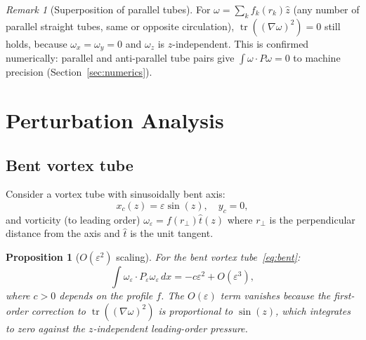 \documentclass[11pt,a4paper]{article}
\theoremstyle{plain}
\newtheorem{proposition}[theorem]{Proposition}
\theoremstyle{definition}
\theoremstyle{remark}
\newtheorem{remark}[theorem]{Remark}
\DeclareMathOperator{\tr}{tr}
\begin{document}
\begin{remark}[Superposition of parallel tubes]
\label{rem:parallel}
For $\omega = \sum_k f_k(r_k)\hat z$ (any number
of parallel straight tubes, same or opposite
circulation), $\tr((\nabla\omega)^2) = 0$ still
holds, because
$\omega_x=\omega_y=0$ and $\omega_z$ is
$z$-independent.
This is confirmed numerically: parallel and
anti-parallel tube pairs give
$\int\omega\cdot P\omega = 0$ to machine
precision (Section~\ref{sec:numerics}).
\end{remark}


\section{Perturbation Analysis}\label{sec:perturb}

\subsection{Bent vortex tube}

Consider a vortex tube with sinusoidally bent
axis:
\begin{equation}\label{eq:bent}
x_c(z) = \varepsilon\sin(z),\quad y_c=0,
\end{equation}
and vorticity (to leading order)
$\omega_\varepsilon = f(r_\perp)\hat t(z)$ where
$r_\perp$ is the perpendicular distance from the
axis and $\hat t$ is the unit tangent.

\begin{proposition}[$O(\varepsilon^2)$ scaling]
\label{prop:scaling}
For the bent vortex tube~\eqref{eq:bent}:
\begin{equation}\label{eq:eps2}
\int\omega_\varepsilon\cdot P_\varepsilon
\omega_\varepsilon\,dx
= -c\varepsilon^2 + O(\varepsilon^3),
\end{equation}
where $c>0$ depends on the profile $f$.
The $O(\varepsilon)$ term vanishes because the
first-order correction to
$\tr((\nabla\omega)^2)$ is proportional to
$\sin(z)$, which integrates to zero against the
$z$-independent leading-order pressure.
\end{proposition}
\end{document}
